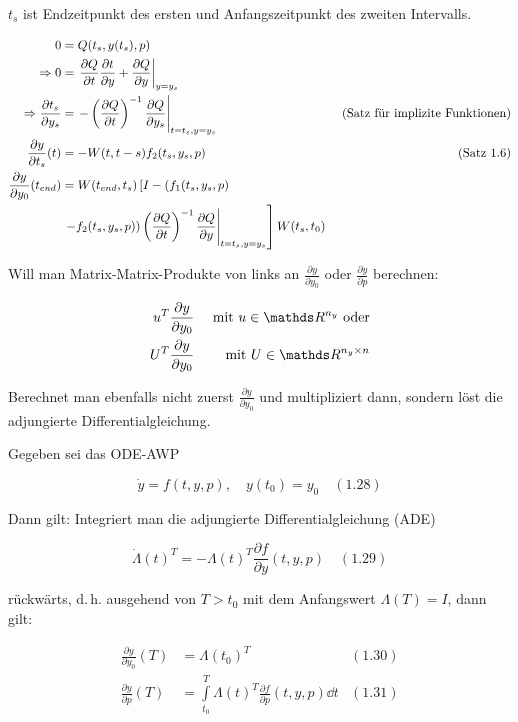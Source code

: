 $t_s$ ist Endzeitpunkt des ersten und Anfangszeitpunkt des zweiten Intervalls.

\begin{align*}
0 &= Q(t_s,y(t_s),p) \\
\Rightarrow 0&= \left. \frac{\partial Q}{\partial t} \frac{\partial t}{\partial y} + \frac{\partial Q}{\partial y} \right|_{y=y_s} \\
\Rightarrow \frac{\partial t_s}{\partial y_s} &= \left. - \left(\frac{\partial Q}{\partial t} \right)^{-1} \frac{\partial Q}{\partial y_s}\right|_{t=t_s, y=y_s} & \text{ (Satz für implizite Funktionen)} \\
\frac{\partial y}{\partial t_s}(t) &= - W(t,t-s) f_2(t_s,y_s,p) & \text{ (Satz 1.6)} \\
\frac{\partial y}{\partial y_0} (t_{end}) &= W(t_{end}, t_s) \left[I - (f_1(t_s,y_s,p) \right. \\
& \left. \left. -f_2(t_s,y_s,p)) \left( \frac{\partial Q}{\partial t}\right)^{-1} \frac{\partial Q}{\partial y} \right|_{t=t_s, y=y_s} \right] W(t_s,t_0)
\end{align*}




Will man Matrix-Matrix-Produkte von links an $\tfrac{\partial y}{\partial y_0}$ oder $\tfrac{\partial y}{\partial p}$ berechnen:

\begin{align*}
u^T \frac{\partial y}{\partial y_0} & & \text{ mit } u\in\R^{n_y} \text{ oder} \\
U^T \frac{\partial y}{\partial y_0} & & \text{ mit } U \in \R^{n_y \times n}
\end{align*}

Berechnet man ebenfalls nicht zuerst $\frac{\partial y}{\partial y_0}$ und multipliziert dann, sondern löst die adjungierte Differentialgleichung.


Gegeben sei das ODE-AWP

\[ \dot y = f(t,y,p), \quad y(t_0) = y_0 \quad (1.28) \]

Dann gilt: Integriert man die adjungierte Differentialgleichung (ADE)

\[ \dot \Lambda (t)^T = -\Lambda(t)^T \frac{\partial f}{\partial y} (t,y,p) \quad (1.29) \]

rückwärts, d.\,h. ausgehend von $T > t_0$ mit dem Anfangswert $\Lambda(T) = I$, dann gilt:

\begin{align*}
\frac{\partial y}{\partial y_0} (T) &= \Lambda (t_0)^T & (1.30) \\
\frac{\partial y}{\partial p} (T) &= \int\limits_{t_0}^T \Lambda(t)^T \frac{\partial f}{\partial p} (t,y,p) \dd t & (1.31)
\end{align*}


